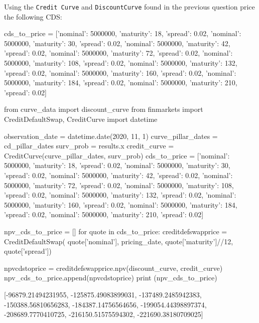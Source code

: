 \cprotEnv\begin{question}
Using the \texttt{Credit\ Curve} and \texttt{DiscountCurve} found in the previous question price the following CDS:

\begin{ipython}
cds_to_price = [{'nominal': 5000000, 'maturity': 18, 'spread': 0.02},
                {'nominal': 5000000, 'maturity': 30, 'spread': 0.02},
                {'nominal': 5000000, 'maturity': 42, 'spread': 0.02},
                {'nominal': 5000000, 'maturity': 72, 'spread': 0.02},
                {'nominal': 5000000, 'maturity': 108, 'spread': 0.02},
                {'nominal': 5000000, 'maturity': 132, 'spread': 0.02},
                {'nominal': 5000000, 'maturity': 160, 'spread': 0.02},
                {'nominal': 5000000, 'maturity': 184, 'spread': 0.02},
                {'nominal': 5000000, 'maturity': 210, 'spread': 0.02}]
\end{ipython}
\end{question}

\cprotEnv\begin{solution}
\begin{ipython}
from curve_data import discount_curve
from finmarkets import CreditDefaultSwap, CreditCurve
import datetime

observation_date = datetime.date(2020, 11, 1)
curve_pillar_dates = cd_pillar_dates
surv_prob = results.x
credit_curve = CreditCurve(curve_pillar_dates, surv_prob)
cds_to_price = [{'nominal': 5000000, 'maturity': 18, 'spread': 0.02},
                {'nominal': 5000000, 'maturity': 30, 'spread': 0.02},
                {'nominal': 5000000, 'maturity': 42, 'spread': 0.02},
                {'nominal': 5000000, 'maturity': 72, 'spread': 0.02},
                {'nominal': 5000000, 'maturity': 108, 'spread': 0.02},
                {'nominal': 5000000, 'maturity': 132, 'spread': 0.02},
                {'nominal': 5000000, 'maturity': 160, 'spread': 0.02},
                {'nominal': 5000000, 'maturity': 184, 'spread': 0.02},
                {'nominal': 5000000, 'maturity': 210, 'spread': 0.02}]

npv_cds_to_price = []
for quote in cds_to_price:
    creditdefswapprice = CreditDefaultSwap(
        quote['nominal'], pricing_date,
        quote['maturity']//12, quote['spread'])

npvcdstoprice = creditdefswapprice.npv(discount_curve, credit_curve)
npv_cds_to_price.append(npvcdstoprice)
print (npv_cds_to_price)

[-96879.21494231955, -125875.49083899031, -137489.2485942383,
 -150388.56810656283, -184387.14756564656, -199054.44398897374,
 -208689.7770410725, -216150.51575594302, -221690.38180709025]
\end{ipython}
\end{solution}
